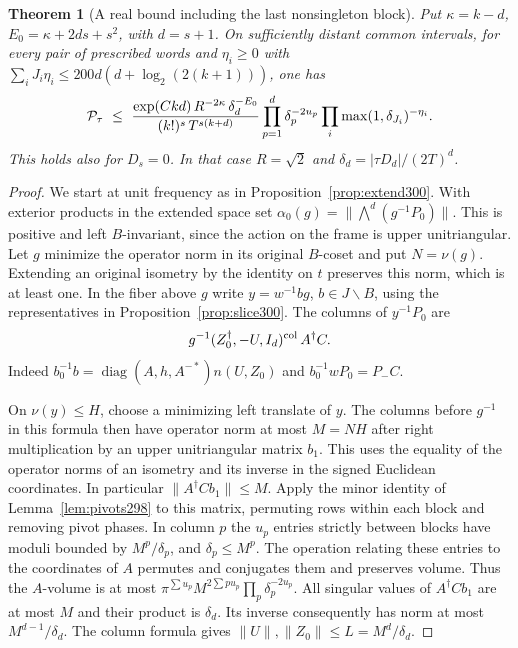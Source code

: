 \documentclass[a4paper,11pt]{article}
\newtheorem{theorem}[proposition]{Theorem}
\theoremstyle{definition}
\theoremstyle{remark}
\numberwithin{equation}{section}
\begin{document}
\begin{theorem}[A real bound including the last nonsingleton block]\leavevmode
\label{thm:realtrans300}
Put \(\kappa=k-d\), \(E_0=\kappa+2ds+s^2\), with \(d=s+1\).
On sufficiently distant common intervals, for every pair of
prescribed words and \(\eta_i\ge0\) with
\(\sum_i J_i\eta_i\le 200d(d+\log_2(2(k+1)))\), one has
\[
 {\cal P}_\tau\ \le\
 \frac{\exp(Ckd)\,R^{-2\kappa}\,\delta_d^{-E_0}}
      {(k!)^s\,T^{s(k+d)}}
 \prod_{p=1}^d\delta_p^{-2u_p}
 \prod_i\max(1,\delta_{J_i})^{-\eta_i}.
\]
This holds also for \(D_s=0\). In that case
\(R=\sqrt2\) and \(\delta_d=|\tau D_d|/(2T)^d\).
\end{theorem}
\begin{proof}
We start at unit frequency as in Proposition~\ref{prop:extend300}.
With exterior products in the extended space set
\(\alpha_0(g)=\|\bigwedge^d(g^{-1}P_0)\|\). This is positive
and left \(B\)-invariant, since the action on the frame is
upper unitriangular. Let \(g\) minimize the operator norm in
its original \(B\)-coset and put \(N=\nu(g)\). Extending an
original isometry by the identity on \(t\) preserves this norm,
which is at least one. In the fiber above \(g\) write
\(y=w^{-1}b g\), \(b\in J\backslash B\), using the representatives
in Proposition~\ref{prop:slice300}. The columns of \(y^{-1}P_0\)
are
\[
        g^{-1}(Z_0^\dagger,-U,I_d)^{\rm col}\,A^\dagger C .
\]
Indeed \(b_0^{-1}b=\operatorname{diag}(A,h,A^{-*})n(U,Z_0)\)
and \(b_0^{-1}wP_0=P_-C\).

On \(\nu(y)\le H\), choose a minimizing left translate of \(y\).
The columns before \(g^{-1}\) in this formula then have operator
norm at most \(M=NH\) after right multiplication by an upper
unitriangular matrix \(b_1\). This uses the equality of the
operator norms of an isometry and its inverse in the signed
Euclidean coordinates. In particular \(\|A^\dagger C b_1\|\le M\).
Apply the minor identity of Lemma~\ref{lem:pivots298} to this
matrix, permuting rows within each block and removing pivot
phases. In column \(p\) the \(u_p\) entries strictly between
blocks have moduli bounded by \(M^p/\delta_p\), and
\(\delta_p\le M^p\). The operation relating these entries to
the coordinates of \(A\) permutes and conjugates them and
preserves volume. Thus the \(A\)-volume is at most
\(\pi^{\sum u_p}M^{2\sum p u_p}\prod_p\delta_p^{-2u_p}\).
All singular values of \(A^\dagger C b_1\) are at most \(M\)
and their product is \(\delta_d\). Its inverse consequently has
norm at most \(M^{d-1}/\delta_d\). The column formula gives
\(\|U\|,\|Z_0\|\le L=M^d/\delta_d\).


\end{proof}
\end{document}

